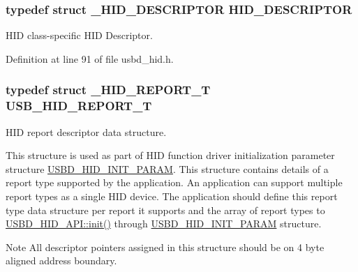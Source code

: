 \subsubsection[{\texorpdfstring{H\+I\+D\+\_\+\+D\+E\+S\+C\+R\+I\+P\+T\+OR}{HID_DESCRIPTOR}}]{\setlength{\rightskip}{0pt plus 5cm}typedef struct {\bf \+\_\+\+H\+I\+D\+\_\+\+D\+E\+S\+C\+R\+I\+P\+T\+OR} {\bf H\+I\+D\+\_\+\+D\+E\+S\+C\+R\+I\+P\+T\+OR}}\hypertarget{group__USBD__HID_ga683d4339556ecbba7d2062c3f90336e8}{}\label{group__USBD__HID_ga683d4339556ecbba7d2062c3f90336e8}
H\+ID class-\/specific H\+ID Descriptor. 

Definition at line 91 of file usbd\+\_\+hid.\+h.

\subsubsection[{\texorpdfstring{U\+S\+B\+\_\+\+H\+I\+D\+\_\+\+R\+E\+P\+O\+R\+T\+\_\+T}{USB_HID_REPORT_T}}]{\setlength{\rightskip}{0pt plus 5cm}typedef struct {\bf \+\_\+\+H\+I\+D\+\_\+\+R\+E\+P\+O\+R\+T\+\_\+T}  {\bf U\+S\+B\+\_\+\+H\+I\+D\+\_\+\+R\+E\+P\+O\+R\+T\+\_\+T}}\hypertarget{group__USBD__HID_gaaa1686adb431783ea4357e6899c0d39d}{}\label{group__USBD__HID_gaaa1686adb431783ea4357e6899c0d39d}


H\+ID report descriptor data structure. 

This structure is used as part of H\+ID function driver initialization parameter structure \hyperlink{structUSBD__HID__INIT__PARAM}{U\+S\+B\+D\+\_\+\+H\+I\+D\+\_\+\+I\+N\+I\+T\+\_\+\+P\+A\+R\+AM}. This structure contains details of a report type supported by the application. An application can support multiple report types as a single H\+ID device. The application should define this report type data structure per report it supports and the array of report types to \hyperlink{structUSBD__HID__API_a7b98c434713f1deb07abafcb52fae76d}{U\+S\+B\+D\+\_\+\+H\+I\+D\+\_\+\+A\+P\+I\+::init()} through \hyperlink{structUSBD__HID__INIT__PARAM}{U\+S\+B\+D\+\_\+\+H\+I\+D\+\_\+\+I\+N\+I\+T\+\_\+\+P\+A\+R\+AM} structure.

\begin{DoxyNote}{Note}
All descriptor pointers assigned in this structure should be on 4 byte aligned address boundary. 
\end{DoxyNote}
